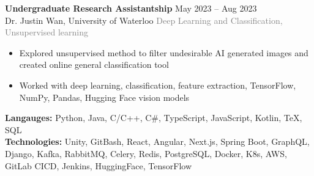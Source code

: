 \documentclass[10pt]{developercv} %
\begin{document}
\begin{minipage}[t]{\textwidth}
\end{minipage}


\begin{minipage}[t]{\textwidth}
	\vspace{-\baselineskip}
	\textbf{Undergraduate Research Assistantship} \hfill May 2023 -- Aug 2023\\
	Dr. Justin Wan, \; University of Waterloo \hfill \textcolor{gray}{Deep Learning and Classification, Unsupervised learning}
	\begin{itemize}[noitemsep,topsep=0pt]
		\item Explored unsupervised method to filter undesirable AI generated images and created online general classification tool
		\item Worked with deep learning, classification, feature extraction, TensorFlow, NumPy, Pandas, Hugging Face vision models
	\end{itemize}
\end{minipage}


\begin{minipage}[t]{\textwidth}
	\vspace{-\baselineskip}
	\textbf{Langauges:} Python, Java, C/C++, C\#, TypeScript, JavaScript, Kotlin, TeX, SQL\\
	\textbf{Technologies:} Unity, GitBash, React, Angular, Next.js, Spring Boot, GraphQL, Django, Kafka, RabbitMQ, Celery, Redis,
	PostgreSQL, Docker, K8s, AWS, GitLab CICD, Jenkins, HuggingFace, TensorFlow
\end{minipage}


\end{document}
